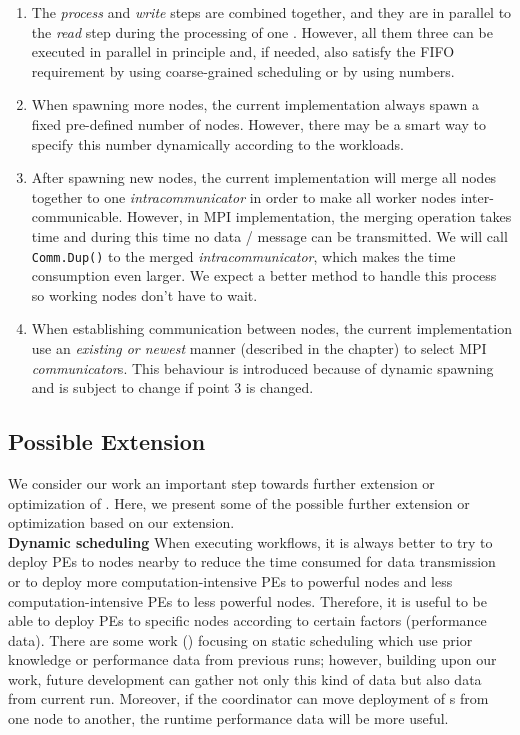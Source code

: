 \begin{enumerate}
	\item The \emph{process} and \emph{write} steps are combined together, and they are in parallel to the \emph{read} step during the processing of one \tPEInst. However, all them three can be executed in parallel in principle and, if needed, also satisfy the FIFO requirement by using coarse-grained scheduling or by using numbers.
	\item When spawning more nodes, the current implementation always spawn a fixed pre-defined number of nodes. However, there may be a smart way to specify this number dynamically according to the workloads.
	\item After spawning new nodes, the current implementation will merge all nodes together to one \emph{intracommunicator} in order to make all worker nodes inter-communicable. However, in MPI implementation, the merging operation takes time and during this time no data / message can be transmitted. We will call \lstinline|Comm.Dup()| to the merged \emph{intracommunicator}, which makes the time consumption even larger. We expect a better method to handle this process so working nodes don't have to wait.
	\item When establishing communication between nodes, the current implementation use an \emph{existing or newest} manner (described in the \tIncDep chapter) to select MPI \emph{communicator}s. This behaviour is introduced because of dynamic spawning and is subject to change if point 3 is changed.
\end{enumerate}

\subsection{Possible Extension}
We consider our work an important step towards further extension or optimization of \dpy. Here, we present some of the possible further extension or optimization based on our extension. \\

\textbf{Dynamic scheduling}\quad
When executing workflows, it is always better to try to deploy PEs to nodes nearby to reduce the time consumed for data transmission or to deploy more computation-intensive PEs to powerful nodes and less computation-intensive PEs to less powerful nodes. Therefore, it is useful to be able to deploy PEs to specific nodes according to certain factors (\eg performance data). There are some work (\eg \cite{teylo2017hybrid}) focusing on static scheduling which use prior knowledge or performance data from previous runs; however, building upon our work, future development can gather not only this kind of data but also data from current run. Moreover, if the coordinator can move deployment of \tPEInst{}s from one node to another, the runtime performance data will be more useful. \\

